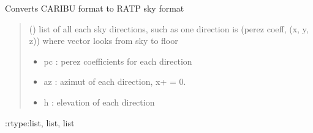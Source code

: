 \documentclass[letterpaper,10pt,english]{sphinxmanual}
\begin{document}
\begin{fulllineitems}
\label{\detokenize{reference:sky.caribuformat_to_ratpformat}}
\pysigstartsignatures
{}
\pysigstopsignatures
\sphinxAtStartPar
Converts CARIBU format to RATP sky format
\begin{quote}\begin{description}
\sphinxAtStartPar
{} () \textendash{} list of all each sky directions, such as one direction is (perez coeff, (x, y, z)) where vector looks from sky to floor

\sphinxAtStartPar
\begin{itemize}
\item {} 
\sphinxAtStartPar
pc : perez coefficients for each direction

\item {} 
\sphinxAtStartPar
az : azimut of each direction, x+ = 0.

\item {} 
\sphinxAtStartPar
h : elevation of each direction

\end{itemize}


\end{description}\end{quote}

\sphinxAtStartPar
:rtype:list, list, list

\end{fulllineitems}

\end{document}
